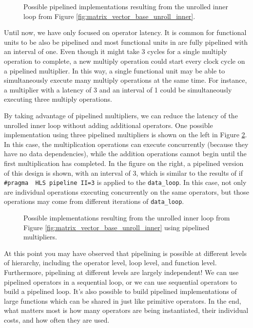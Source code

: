 \begin{figure}
\centering

\caption{Possible pipelined implementations resulting from the unrolled inner loop from Figure \ref{fig:matrix_vector_base_unroll_inner}.}\label{fig:dft_behavior2}
\end{figure}

Until now, we have only focused on operator latency.  It is common for functional units to be also be pipelined and most functional units in \VHLS are fully pipelined with an interval of one. Even though it might take 3 cycles for a single multiply operation to complete, a new multiply operation could start every clock cycle on a pipelined multiplier.  In this way, a single functional unit may be able to simultaneously execute many multiply operations at the same time.  For instance, a multiplier with a latency of 3 and an interval of 1 could be simultaneously executing three multiply operations. 

By taking advantage of pipelined multipliers, we can reduce the latency of the unrolled inner loop without adding additional operators.  One possible implementation using three pipelined multipliers is shown on the left in Figure \ref{fig:dft_behavior_pipelined}.  In this case, the multiplication operations can execute concurrently (because they have no data dependencies), while the addition operations cannot begin until the first multiplication has completed.  In the figure on the right, a pipelined version of this design is shown, with an interval of 3, which is similar to the results of \VHLS if \lstinline|#pragma  HLS pipeline II=3| is applied to the \lstinline|data_loop|.  In this case, not only are individual operations executing concurrently on the same operators, but those operations may come from different iterations of \lstinline|data_loop|.  

\begin{figure}
\centering

\caption{Possible implementations resulting from the unrolled inner loop from Figure \ref{fig:matrix_vector_base_unroll_inner} using pipelined multipliers.}\label{fig:dft_behavior_pipelined}
\end{figure}

At this point you may have observed that pipelining is possible at different levels of hierarchy, including the operator level, loop level, and function level.  Furthermore, pipelining at different levels are largely independent!  We can use pipelined operators in a sequential loop, or we can use sequential operators to build a pipelined loop.  It's also possible to build pipelined implementations of large functions which can be shared in \VHLS just like primitive operators.  In the end, what matters most is how many operators are being instantiated, their individual costs, and how often they are used.

